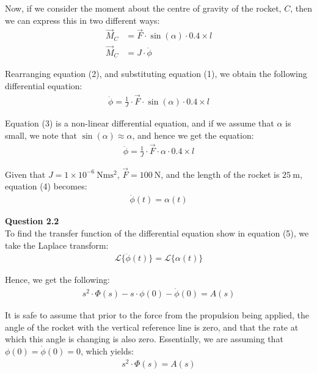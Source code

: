 \documentclass{article}
\begin{document}
	Now, if we consider the moment about the centre of gravity of the rocket, $C$, then we can express this in two different ways:
	\begin{align}
		\vec{M}_C &= \vec{F} \cdot \sin (\alpha) \cdot 0.4 \times l\\
		\vec{M}_C &= J \cdot \ddot{\phi}
	\end{align}

	Rearranging equation (2), and substituting equation (1), we obtain the following differential equation:
	\begin{align}
		\ddot{\phi} = \frac{1}{J} \cdot \vec{F} \cdot \sin (\alpha) \cdot 0.4 \times l
	\end{align}
	
	Equation (3) is a non-linear differential equation, and if we assume that $\alpha$ is small, we note that $\sin (\alpha) \approx \alpha$, and hence we get the equation:
	\begin{align}
		\ddot{\phi} = \frac{1}{J} \cdot \vec{F} \cdot \alpha \cdot 0.4 \times l
	\end{align}
	
	Given that $J = 1 \times 10^{-6} \ \si{\newton\meter\second^2}$, $\vec{F} = 100 \ \si{\newton}$, and the length of the rocket is $25 \ \si{\meter}$, equation (4) becomes:
	\begin{align}
		\ddot{\phi}(t) = \alpha (t)
	\end{align}
	
	

 
    \textbf{Question 2.2}\\
    
    To find the transfer function of the differential equation show in equation (5), we take the Laplace transform:
    \begin{align*}
	    \mathscr{L}\{\ddot{\phi}(t)\} = \mathscr{L}\{\alpha (t)\}
    \end{align*}
	
	Hence, we get the following:
	\begin{align*}
		s^2 \cdot \Phi(s) - s \cdot \phi(0) - \dot{\phi}(0) = A(s)
	\end{align*}
	
	It is safe to assume that prior to the force from the propulsion being applied, the angle of the rocket with the vertical reference line is zero, and that the rate at which this angle is changing is also zero. Essentially, we are assuming that $\phi(0) = \dot{\phi}(0) = 0$, which yields:
	\begin{align*}
		s^2 \cdot \Phi(s) = A(s)
	\end{align*}
	
\end{document}
